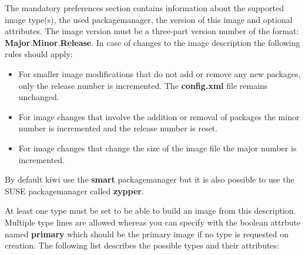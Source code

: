 The mandatory preferences section contains information about the supported
image type(s), the used packagemanager, the version of this image and
optional attributes. The image version must be a three-part version number of
the format: \textbf{Major}.\textbf{Minor}.\textbf{Release}. In case of
changes to the image description the following rules should apply:

\begin{itemize}
\item For smaller image modifications that do not add or remove any
      new packages, only the release number is incremented.
      The \textbf{config.xml} file remains unchanged.
\item For image changes that involve the addition or removal of packages
      the minor number is incremented and the release number is reset.
\item For image changes that change the size of the image file
      the major number is incremented.
\end{itemize}

By default kiwi use the \textbf{smart} packagemanager but it is also possible
to use the SUSE packagemanager called \textbf{zypper}.

At least one type must be set to be able to build an image from
this description. Multiple type lines are allowed whereas you can specify
with the boolean attrbute named \textbf{primary} which should be the primary
image if no type is requested on creation. The following list
describes the possible types and their attributes:

